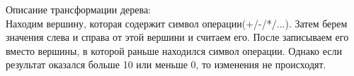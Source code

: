 \begin{spacing}{1}

\indent Описание трансформации дерева:\\
\indent Находим вершину, которая содержит символ операции(+/-/*/...). 
Затем берем значения слева и справа от этой вершини и считаем его. 
После записываем его вместо вершины, в которой раньше находился символ 
операции. Однако если результат оказался больше 10 или меньше 0, 
то изменения не происходят.

\end{spacing}
